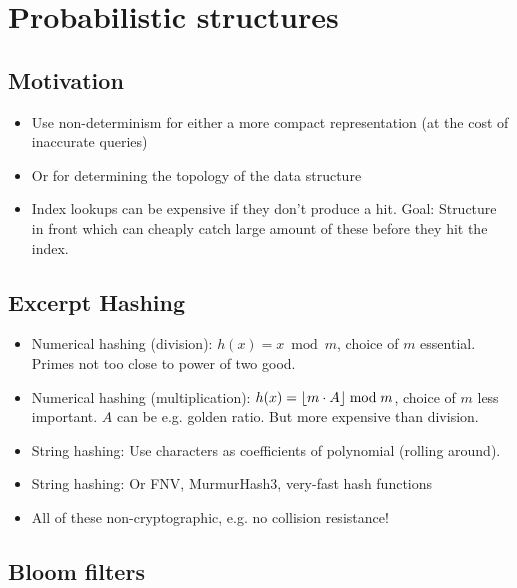 \documentclass[a4paper]{scrreprt}
\DeclarePairedDelimiter\floor{\lfloor}{\rfloor}
\begin{document}
\chapter{Probabilistic structures}

\section{Motivation}

\begin{itemize}
		\item Use non-determinism for either a more compact representation (at
				the cost of inaccurate queries)
		\item Or for determining the topology of the data structure
		\item Index lookups can be expensive if they don't produce a hit. Goal:
				Structure in front which can cheaply catch large amount of
				these before they hit the index.
\end{itemize}

\section{Excerpt Hashing}

\begin{itemize}
		\item Numerical hashing (division): $h(x) = x \bmod m$, choice of $m$
				essential.  Primes not too close to power of two good.
		\item Numerical hashing (multiplication): $h(x) = \floor{m \cdot A}
				\bmod m$, choice of $m$ less important. $A$ can be e.g. golden
				ratio. But more expensive than division.
		\item String hashing: Use characters as coefficients of polynomial
				(rolling around).
		\item String hashing: Or FNV, MurmurHash3, very-fast hash functions
		\item All of these non-cryptographic, e.g. no collision resistance!
\end{itemize}

\section{Bloom filters}
\end{document}
